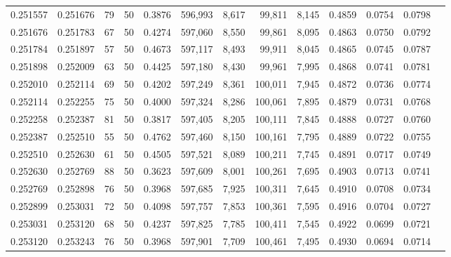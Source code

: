 \begin{tabular}{rrrrrrrrrrrrr}
0.251557 & 0.251676 &    79 &  50 &                                     0.3876 & 596,993 &   8,617 &  99,811 &   8,145 & 0.4859 & 0.0754 & 0.0798 \\
0.251676 & 0.251783 &    67 &  50 &                                     0.4274 & 597,060 &   8,550 &  99,861 &   8,095 & 0.4863 & 0.0750 & 0.0792 \\
0.251784 & 0.251897 &    57 &  50 &                                     0.4673 & 597,117 &   8,493 &  99,911 &   8,045 & 0.4865 & 0.0745 & 0.0787 \\
0.251898 & 0.252009 &    63 &  50 &                                     0.4425 & 597,180 &   8,430 &  99,961 &   7,995 & 0.4868 & 0.0741 & 0.0781 \\
0.252010 & 0.252114 &    69 &  50 &                                     0.4202 & 597,249 &   8,361 & 100,011 &   7,945 & 0.4872 & 0.0736 & 0.0774 \\
0.252114 & 0.252255 &    75 &  50 &                                     0.4000 & 597,324 &   8,286 & 100,061 &   7,895 & 0.4879 & 0.0731 & 0.0768 \\
0.252258 & 0.252387 &    81 &  50 &                                     0.3817 & 597,405 &   8,205 & 100,111 &   7,845 & 0.4888 & 0.0727 & 0.0760 \\
0.252387 & 0.252510 &    55 &  50 &                                     0.4762 & 597,460 &   8,150 & 100,161 &   7,795 & 0.4889 & 0.0722 & 0.0755 \\
0.252510 & 0.252630 &    61 &  50 &                                     0.4505 & 597,521 &   8,089 & 100,211 &   7,745 & 0.4891 & 0.0717 & 0.0749 \\
0.252630 & 0.252769 &    88 &  50 &                                     0.3623 & 597,609 &   8,001 & 100,261 &   7,695 & 0.4903 & 0.0713 & 0.0741 \\
0.252769 & 0.252898 &    76 &  50 &                                     0.3968 & 597,685 &   7,925 & 100,311 &   7,645 & 0.4910 & 0.0708 & 0.0734 \\
0.252899 & 0.253031 &    72 &  50 &                                     0.4098 & 597,757 &   7,853 & 100,361 &   7,595 & 0.4916 & 0.0704 & 0.0727 \\
0.253031 & 0.253120 &    68 &  50 &                                     0.4237 & 597,825 &   7,785 & 100,411 &   7,545 & 0.4922 & 0.0699 & 0.0721 \\
0.253120 & 0.253243 &    76 &  50 &                                     0.3968 & 597,901 &   7,709 & 100,461 &   7,495 & 0.4930 & 0.0694 & 0.0714 \\

\end{tabular}
